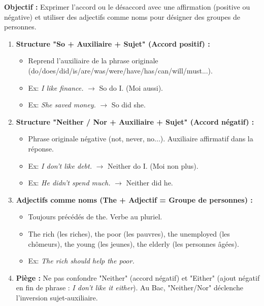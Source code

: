 \documentclass[11pt]{article}
\newcommand{\cle}[1]{{\popxbold\color{popdark}#1}}
\begin{document}
\begin{methode}
    \textbf{Objectif :} Exprimer l'accord ou le désaccord avec une affirmation (positive ou négative) et utiliser des adjectifs comme noms pour désigner des groupes de personnes.
    \begin{enumerate}
        \item \textbf{Structure "So + Auxiliaire + Sujet" (Accord positif) :}
              \begin{itemize}
                  \item Reprend l'auxiliaire de la phrase originale (do/does/did/is/are/was/were/have/has/can/will/must...).
                  \item Ex: \emph{I like finance.} $\rightarrow$ \cle{So do I.} (Moi aussi).
                  \item Ex: \emph{She saved money.} $\rightarrow$ \cle{So did she.}
              \end{itemize}
        \item \textbf{Structure "Neither / Nor + Auxiliaire + Sujet" (Accord négatif) :}
              \begin{itemize}
                  \item Phrase originale négative (not, never, no...). Auxiliaire affirmatif dans la réponse.
                  \item Ex: \emph{I don't like debt.} $\rightarrow$ \cle{Neither do I.} (Moi non plus).
                  \item Ex: \emph{He didn't spend much.} $\rightarrow$ \cle{Neither did he.}
              \end{itemize}
        \item \textbf{Adjectifs comme noms (The + Adjectif = Groupe de personnes) :}
              \begin{itemize}
                  \item Toujours précédés de \cle{the}. Verbe au pluriel.
                  \item \cle{The rich} (les riches), \cle{the poor} (les pauvres), \cle{the unemployed} (les chômeurs), \cle{the young} (les jeunes), \cle{the elderly} (les personnes âgées).
                  \item Ex: \emph{\cle{The rich} should help \cle{the poor}.}
              \end{itemize}
        \item \textbf{Piège :} Ne pas confondre "Neither" (accord négatif) et "Either" (ajout négatif en fin de phrase : \emph{I don't like it either}). Au Bac, "Neither/Nor" déclenche l'inversion sujet-auxiliaire.
    \end{enumerate}
\end{methode}
\end{document}
